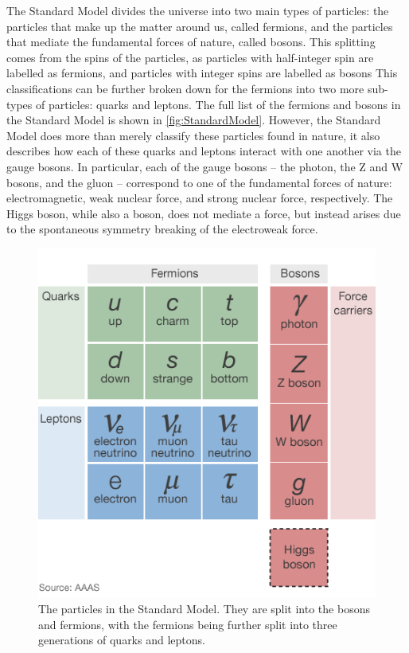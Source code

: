 The Standard Model divides the universe into two main types of particles: the particles that make up the matter around us, called fermions, and the particles that mediate the fundamental forces of nature, called bosons.
This splitting comes from the spins of the particles, as particles with half-integer spin are labelled as fermions, and particles with integer spins are labelled as bosons
This classifications can be further broken down for the fermions into two more sub-types of particles: quarks and leptons.
The full list of the fermions and bosons in the Standard Model is shown in \autoref{fig:StandardModel}.
However, the Standard Model does more than merely classify these particles found in nature, it also describes how each of these quarks and leptons interact with one another via the gauge bosons.
In particular, each of the gauge bosons -- the photon, the Z and W bosons, and the gluon -- correspond to one of the fundamental forces of nature: electromagnetic, weak nuclear force, and strong nuclear force, respectively.
The Higgs boson, while also a boson, does not mediate a force, but instead arises due to the spontaneous symmetry breaking of the electroweak force. 

\begin{figure}[tbph]
\centering
\includegraphics[width=0.6\linewidth]{Figures/higgs-elementary-particles.png}
\caption[The particles in the Standard Model]{The particles in the Standard Model. They are split into the bosons and fermions, with the fermions being further split into three generations of quarks and leptons.}
\label{fig:StandardModel}
\end{figure}

